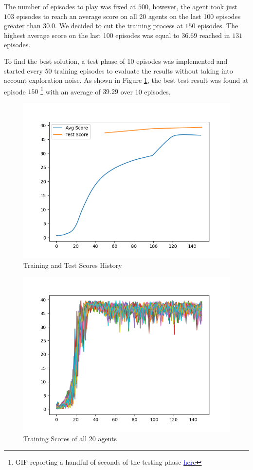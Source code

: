 \documentclass[letterpaper]{article}
\begin{document}
The number of episodes to play was fixed at $500$, however, the agent took just $103$ episodes to reach an average score on all 20 agents on the last 100 episodes greater than $30.0$. We decided to cut the training process at $150$ episodes. The highest average score on the last 100 episodes was equal to $36.69$ reached in $131$ episodes.

To find the best solution, a test phase of 10 episodes was implemented and started every 50 training episodes to evaluate the results without taking into account exploration noise. As shown in Figure \ref{fig:plot}, the best test result was found at episode $150$ \footnote{GIF reporting a handful of seconds of the testing phase \href{https://github.com/pieromacaluso/continuous-control/blob/17becf554171be594d56cea02d1f0855339915f8/stuff/solved_gif.gif}{\textcolor{blue}{here}}} with an average of $39.29$ over 10 episodes.

\begin{figure}[]
\includegraphics[width=\linewidth]{img/avg.png}
\caption{Training and Test Scores History\label{fig:plot}}
\end{figure}   

\begin{figure}[]
\includegraphics[width=\linewidth]{img/scores.png}
\caption{Training Scores of all 20 agents\label{fig:plot2}}
\end{figure}   
\end{document}
